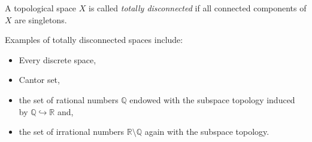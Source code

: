 \documentclass[12pt]{article}
\theoremstyle{definition}
\theoremstyle{remark}
\numberwithin{equation}{subsection}
\newcommand{\BR}{\mathbb{R}}
\newcommand{\BQ}{\mathbb{Q}}
\begin{document}
A topological space $X$ is called \emph{totally disconnected} if all  connected components of $X$ are singletons.

Examples of totally disconnected spaces include:
\begin{itemize}
\item Every discrete space,
\item Cantor set,
\item the set of rational numbers $\BQ$ endowed with the subspace topology induced by $\BQ\hookrightarrow \BR$ and,
\item the set of irrational numbers $\BR\setminus\BQ$ again with the subspace topology.
\end{itemize}
\end{document}
